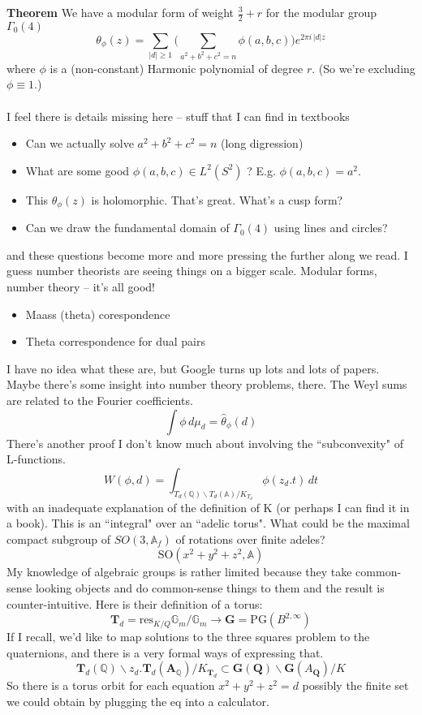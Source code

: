 \documentclass[12pt]{article}
\begin{document}
\newpage

\noindent \textbf{Theorem} We have a modular form of weight $\frac{3}{2} + r$ for the modular group $\Gamma_0(4)$
$$ \theta_\phi(z) = \sum_{|d|\geq 1} \bigg( \sum_{a^2 + b^2 + c^2 = n}\phi(a,b,c) \bigg)e^{2\pi i \, |d|z} $$ 
where $\phi$ is a (non-constant) Harmonic polynomial of degree $r$.  (So we're excluding $\phi \equiv 1$.) \\ \\
I feel there is details missing here -- stuff that I can find in textbooks
\begin{itemize}
\item Can we actually solve $a^2 + b^2 + c^2 = n$ (long digression)
\item What are some good $\phi(a,b,c) \in L^2(S^2)$ ? E.g. $\phi(a,b,c) = a^2$.
\item This $\theta_\phi(z)$ is holomorphic.  That's great.  What's a cusp form?
\item Can we draw the fundamental domain of $\Gamma_0(4)$ using lines and circles?
\end{itemize}
and these questions become more and more pressing the further along we read. I guess number theorists are seeing things on a bigger scale.  Modular forms, number theory -- it's all good!  
\begin{itemize}
\item Maass (theta) corespondence
\item Theta correspondence for dual pairs
\end{itemize}
I have no idea what these are, but Google turns up lots and lots of papers.  Maybe there's some insight into number theory problems, there.   The Weyl sums are related to the Fourier coefficients.
$$ \int \phi \,  d\mu_d =  \widehat{\theta}_\phi(d) $$
There's another proof I don't know much about involving the ``subconvexity" of L-functions.
$$ W(\phi, d) = \int_{T_d(\mathbb{Q}) \backslash T_d(\mathbb{A})/K_{T_d} } \phi( z_d . t) \, dt $$
with an inadequate explanation of the definition of K (or perhaps I can find it in a book).  This is an ``integral" over an ``adelic torus".  What could be the maximal compact subgroup of $SO(3, \mathbb{A}_f)$ of rotations over finite adeles?
$$  \mathrm{SO}( x^2 + y^2 + z^2, \mathbb{A}) $$
My knowledge of algebraic groups is rather limited because they take common-sense looking objects and do common-sense things to them and the result is counter-intuitive.  Here is their definition of a torus:
$$ \mathbf{T}_d = \text{res}_{K/Q} \mathbb{G}_m / \mathbb{G}_m \to \mathbf{G} = \mathrm{PG} (B^{2, \infty}) $$
If I recall, we'd like to map solutions to the three squares problem to the quaternions, and there is a very formal ways of expressing that.  
$$ \mathbf{T}_d(\mathbb{Q})\backslash z_d.\mathbf{T}_d(\mathbf{A}_\mathbb{Q}) /K_{\mathbf{T}_d} \subset \mathbf{G}(\mathbf{Q})\backslash \mathbf{G}(A_\mathbf{Q})/K $$
So there is a torus orbit for each equation $x^2 + y^2 + z^2 = d$ possibly the finite set we could obtain by plugging the eq into a calculator.
\end{document}
